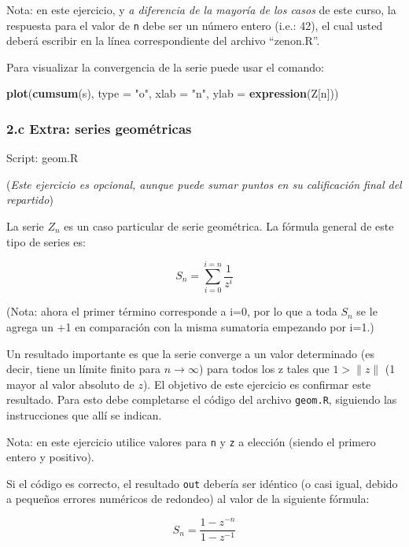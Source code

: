 \documentclass[]{article}
\newenvironment{Shaded}{}{}
\newcommand{\KeywordTok}[1]{\textcolor[rgb]{0.00,0.44,0.13}{\textbf{{#1}}}}
\newcommand{\DataTypeTok}[1]{\textcolor[rgb]{0.56,0.13,0.00}{{#1}}}
\newcommand{\StringTok}[1]{\textcolor[rgb]{0.25,0.44,0.63}{{#1}}}
\newcommand{\NormalTok}[1]{{#1}}
\begin{document}
Nota: en este ejercicio, y \emph{a diferencia de la mayoría de los
casos} de este curso, la respuesta para el valor de \texttt{n} debe ser
un número entero (i.e.: 42), el cual usted deberá escribir en la línea
correspondiente del archivo ``zenon.R''.

Para visualizar la convergencia de la serie puede usar el comando:

\begin{Shaded}
\begin{Highlighting}[]
\KeywordTok{plot}\NormalTok{(}\KeywordTok{cumsum}\NormalTok{(s), }\DataTypeTok{type =} \StringTok{"o"}\NormalTok{, }\DataTypeTok{xlab =} \StringTok{"n"}\NormalTok{, }\DataTypeTok{ylab =} \KeywordTok{expression}\NormalTok{(Z[n]))}
\end{Highlighting}
\end{Shaded}
\subsubsection{2.c Extra: series geométricas}

Script: geom.R

(\emph{Este ejercicio es opcional, aunque puede sumar puntos en su
calificación final del repartido})

La serie $Z_n$ es un caso particular de serie geométrica. La fórmula
general de este tipo de series es:

\[
  S_n = \sum_{i=0}^{i=n} \frac{1}{z ^ i}
\]

(Nota: ahora el primer término corresponde a i=0, por lo que a toda
$S_n$ se le agrega un +1 en comparación con la misma sumatoria empezando
por i=1.)

Un resultado importante es que la serie converge a un valor determinado
(es decir, tiene un límite finito para $n \to \infty$) para todos los z
tales que $1 > \|z\|$ (1 mayor al valor absoluto de $z$). El objetivo de
este ejercicio es confirmar este resultado. Para esto debe completarse
el código del archivo \texttt{geom.R}, siguiendo las instrucciones que
allí se indican.

Nota: en este ejercicio utilice valores para \texttt{n} y \texttt{z} a
elección (siendo el primero entero y positivo).

Si el código es correcto, el resultado \texttt{out} debería ser idéntico
(o casi igual, debido a pequeños errores numéricos de redondeo) al valor
de la siguiente fórmula:

\[
  S_n = \frac{1 - z ^ {- n}}{1 - z ^ {-1}}
\]
\end{document}
